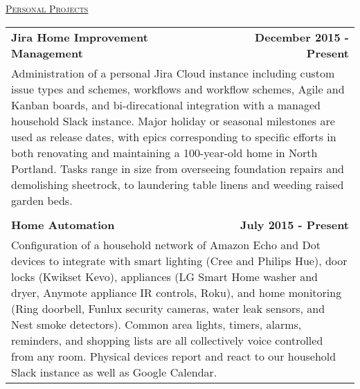 \documentclass[letterpaper]{article}
\begin{document}
    \begin{center}
		\underline{\large \scshape Personal Projects} \\
		\begin{tabular}{p{}r}
				\textbf{Jira Home Improvement Management}							&
				\textbf{December 2015 - Present}
			\\
				\multicolumn{2}{p{\textwidth}}{\quad\quad Administration of a personal Jira Cloud instance including custom issue types and schemes, workflows and workflow schemes, Agile and Kanban boards, and bi-direcational integration with a managed household Slack instance. Major holiday or seasonal milestones are used as release dates, with epics corresponding to specific efforts in both renovating and maintaining a 100-year-old home in North Portland. Tasks range in size from overseeing foundation repairs and demolishing sheetrock, to laundering table linens and weeding raised garden beds.}
			
			\\
			\\
				\textbf{Home Automation}			&
				\textbf{July 2015 - Present}
			\\
				\multicolumn{2}{p{\textwidth}}{\quad\quad Configuration of a household network of Amazon Echo and Dot devices to integrate with smart lighting (Cree and Philips Hue), door locks (Kwikset Kevo), appliances (LG Smart Home washer and dryer, Anymote appliance IR controls, Roku), and home monitoring (Ring doorbell, Funlux security cameras, water leak sensors, and Nest smoke detectors). Common area lights, timers, alarms, reminders, and shopping lists are all collectively voice controlled from any room. Physical devices report and react to our household Slack instance as well as Google Calendar.}
		\end{tabular}
	\end{center} 
\end{document}
